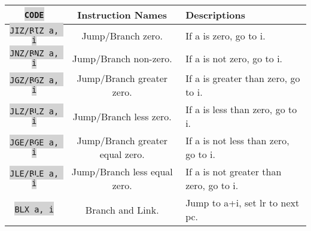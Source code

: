 \documentclass{article}
\newcommand{\vnscode}[1]{\colorbox{lightgray}{\lstinline[language=vns]{#1}}}
\begin{document}
\begin{minipage}{\textwidth}
\centering
\begin{tabular}{|c|c|l|}
    \hline \vnscode{CODE} & Instruction Names & Descriptions \\ \hline
    \vnscode{JIZ/BIZ a, i} & Jump/Branch zero. & If a is zero, go to i. \\ \hline
    \vnscode{JNZ/BNZ a, i} & Jump/Branch non-zero. & If a is not zero, go to i. \\ \hline
    \vnscode{JGZ/BGZ a, i} & Jump/Branch greater zero. & If a is greater than zero, go to i. \\ \hline
    \vnscode{JLZ/BLZ a, i} & Jump/Branch less zero. & If a is less than zero, go to i. \\ \hline
    \vnscode{JGE/BGE a, i} & Jump/Branch greater equal zero. & If a is not less than zero, go to i. \\ \hline
    \vnscode{JLE/BLE a, i} & Jump/Branch less equal zero. & If a is not greater than zero, go to i. \\ \hline
    \vnscode{BLX a, i} & Branch and Link. & Jump to a+i, set lr to next pc. \\ \hline
\end{tabular}
\end{minipage}
\end{document}
